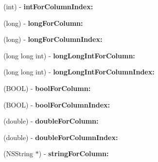 \begin{DoxyCompactItemize}
\item 
\hypertarget{interface_f_m_result_set_a31815ba3713632f5aaae8c2d819c5d7c}{
(int) -\/ {\bfseries intForColumnIndex:}}
\label{interface_f_m_result_set_a31815ba3713632f5aaae8c2d819c5d7c}

\item 
\hypertarget{interface_f_m_result_set_ad6d853f9c70a784e964aad2a5cb33b7e}{
(long) -\/ {\bfseries longForColumn:}}
\label{interface_f_m_result_set_ad6d853f9c70a784e964aad2a5cb33b7e}

\item 
\hypertarget{interface_f_m_result_set_ae3309a1cdf332626fbdd0ca0eb968ff9}{
(long) -\/ {\bfseries longForColumnIndex:}}
\label{interface_f_m_result_set_ae3309a1cdf332626fbdd0ca0eb968ff9}

\item 
\hypertarget{interface_f_m_result_set_abfd6453b6c5898faf1758a45cd903f04}{
(long long int) -\/ {\bfseries longLongIntForColumn:}}
\label{interface_f_m_result_set_abfd6453b6c5898faf1758a45cd903f04}

\item 
\hypertarget{interface_f_m_result_set_a67047154294516ac8f0242de70a4795a}{
(long long int) -\/ {\bfseries longLongIntForColumnIndex:}}
\label{interface_f_m_result_set_a67047154294516ac8f0242de70a4795a}

\item 
\hypertarget{interface_f_m_result_set_a6fb22897c9730b099620e82cd3c95b3f}{
(BOOL) -\/ {\bfseries boolForColumn:}}
\label{interface_f_m_result_set_a6fb22897c9730b099620e82cd3c95b3f}

\item 
\hypertarget{interface_f_m_result_set_a4f310c44eb9811bb593257ad4b8f7536}{
(BOOL) -\/ {\bfseries boolForColumnIndex:}}
\label{interface_f_m_result_set_a4f310c44eb9811bb593257ad4b8f7536}

\item 
\hypertarget{interface_f_m_result_set_a742716ef65bd24bd4019dcde9783675e}{
(double) -\/ {\bfseries doubleForColumn:}}
\label{interface_f_m_result_set_a742716ef65bd24bd4019dcde9783675e}

\item 
\hypertarget{interface_f_m_result_set_a6ec346e15cfb1e0ea5f5d3ac4f639576}{
(double) -\/ {\bfseries doubleForColumnIndex:}}
\label{interface_f_m_result_set_a6ec346e15cfb1e0ea5f5d3ac4f639576}

\item 
\hypertarget{interface_f_m_result_set_a9711210943b2eb77bdbd911e27dfc93a}{
(NSString $\ast$) -\/ {\bfseries stringForColumn:}}
\label{interface_f_m_result_set_a9711210943b2eb77bdbd911e27dfc93a}


\end{DoxyCompactItemize}
